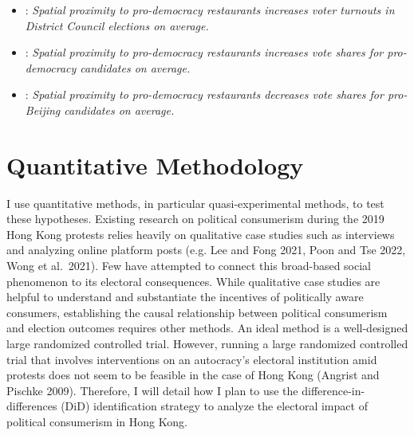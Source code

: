 \documentclass[letterpaper, 12pt]{article}
\begin{document}
\begin{itemize}
    \item {}: \textit{Spatial proximity to pro-democracy restaurants increases voter turnouts in District Council elections on average.}
    \item {}: \textit{Spatial proximity to pro-democracy restaurants increases vote shares for pro-democracy candidates on average.}
    \item {}: \textit{Spatial proximity to pro-democracy restaurants decreases vote shares for pro-Beijing candidates on average.}
\end{itemize}





\section{Quantitative Methodology}
I use quantitative methods, in particular quasi-experimental methods, to test these hypotheses. Existing research on political consumerism during the 2019 Hong Kong protests relies heavily on qualitative case studies such as interviews and analyzing online platform posts (e.g. Lee and Fong 2021, Poon and Tse 2022, Wong et al.\ 2021). Few have attempted to connect this broad-based social phenomenon to its electoral consequences. While qualitative case studies are helpful to understand and substantiate the incentives of politically aware consumers, establishing the causal relationship between political consumerism and election outcomes requires other methods. An ideal method is a well-designed large randomized controlled trial. However, running a large randomized controlled trial that involves interventions on an autocracy's electoral institution amid protests does not seem to be feasible in the case of Hong Kong (Angrist and Pischke 2009). Therefore, I will detail how I plan to use the difference-in-differences (DiD) identification strategy to analyze the electoral impact of political consumerism in Hong Kong.
\end{document}
